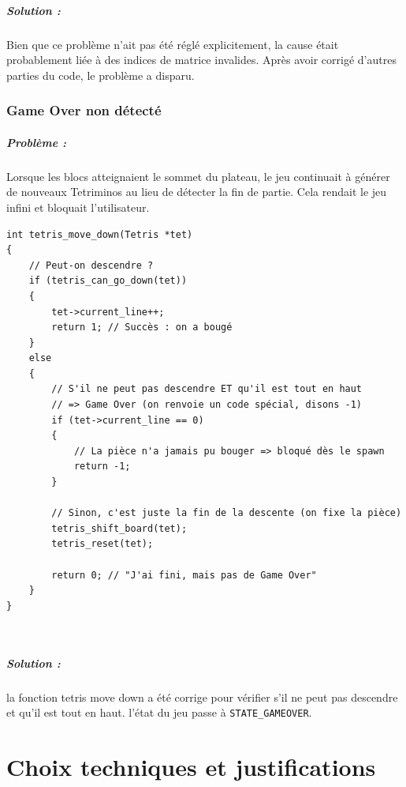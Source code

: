 \documentclass[12pt,a4paper]{report}
\begin{document}
\paragraph{Solution :}
Bien que ce problème n’ait pas été réglé explicitement, la cause était probablement liée à des indices de matrice invalides. Après avoir corrigé d’autres parties du code, le problème a disparu.
\newpage

\subsection{Game Over non détecté}
\paragraph{Problème :}
Lorsque les blocs atteignaient le sommet du plateau, le jeu continuait à générer de nouveaux Tetriminos au lieu de détecter la fin de partie. Cela rendait le jeu infini et bloquait l'utilisateur.
\\

\begin{lstlisting}
int tetris_move_down(Tetris *tet)
{
    // Peut-on descendre ?
    if (tetris_can_go_down(tet))
    {
        tet->current_line++;
        return 1; // Succès : on a bougé
    }
    else
    {
        // S'il ne peut pas descendre ET qu'il est tout en haut
        // => Game Over (on renvoie un code spécial, disons -1)
        if (tet->current_line == 0)
        {
            // La pièce n'a jamais pu bouger => bloqué dès le spawn
            return -1;
        }

        // Sinon, c'est juste la fin de la descente (on fixe la pièce)
        tetris_shift_board(tet);
        tetris_reset(tet);

        return 0; // "J'ai fini, mais pas de Game Over"
    }
}
\end{lstlisting}

\\
\paragraph{Solution :}
la fonction tetris move down a été corrige pour vérifier s'il ne peut pas descendre et qu'il est tout en haut. l’état du jeu passe à \texttt{STATE\_GAMEOVER}.


\newpage
\chapter{Choix techniques et justifications}
\end{document}
